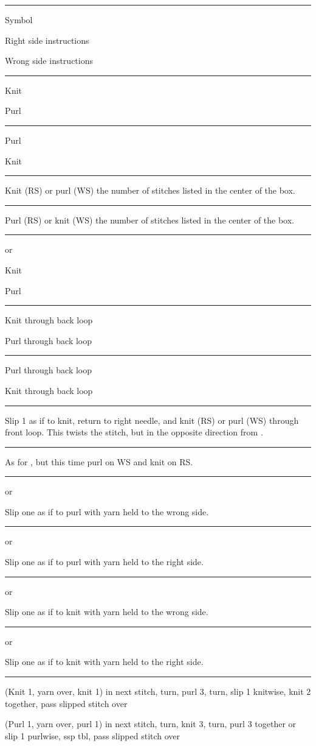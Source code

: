 \documentclass{amsart}
\newif \ifdesigner
\newlength{\symbolcolwidth}
\newlength{\singlecolwidth}
\newlength{\doublecolwidth}
\newcommand\keyrow[3]{\par\allowbreak\hrule\par\nopagebreak\noindent
	\vrule\hfill 
	\begin{minipage}{\symbolcolwidth}\centering#1\end{minipage}%
	\hfill\vrule\hfill
	\begin{minipage}{\singlecolwidth}
		\raisebox{1pt}{\strut}#2\raisebox{-1pt}{\strut}\end{minipage}%
	\hfill\vrule\hfill
	\begin{minipage}{\singlecolwidth}
		\raisebox{1pt}{\strut}#3\raisebox{-1pt}{\strut}\end{minipage}%
	\hfill\vrule
	\par\nointerlineskip}
\newcommand\dblkeyrow[2]{\par\allowbreak\hrule\par\nopagebreak\noindent
	\vrule\hfill
	\begin{minipage}{\symbolcolwidth}\centering#1\end{minipage}%
	\hfill\vrule\hfill
	\begin{minipage}{\doublecolwidth}
		\raisebox{1pt}{\strut}#2\raisebox{-1pt}{\strut}\end{minipage}%
	\hfill\vrule
	\par\nointerlineskip}
\begin{document}
\begin{fullpages}
\keyrow{Symbol}{Right side instructions}{Wrong side instructions}
\keyrow{\textknit{-}}{Knit}{Purl}
\keyrow{\textknit{=}}{Purl}{Knit}
\dblkeyrow{}{Knit (RS) or purl (WS) the number of stitches listed in the center of the box.}
\dblkeyrow{}{Purl (RS) or knit (WS) the number of stitches listed in the center of the box.}
\keyrow{\textknit{)} or \textknit{(}}{Knit}{Purl}
\keyrow{}{Knit through back loop}{Purl through back loop}
\keyrow{}{Purl through back loop}{Knit through back loop}
\dblkeyrow{}{Slip 1 as if to knit, return to right needle, and knit (RS) or purl (WS) through front loop. This twists the stitch, but in the opposite direction from \textknit{b}.}
\dblkeyrow{}{As for , but this time purl on WS and knit on RS.}
\dblkeyrow{ or }{Slip one as if to purl with yarn held to the wrong side.}
\dblkeyrow{ or \textknit{\purlbackground{S}}}
{Slip one as if to purl with yarn held to the right side.}
\dblkeyrow{\textknit{[} or \textknit{]}}{Slip one as if to knit with yarn held to the wrong side.}
\dblkeyrow{\textknit{\purlbackground{[}} or \textknit{\purlbackground{]}}}{Slip one as if to knit with yarn held to the right side.}
\keyrow{}
{(Knit 1, yarn over, knit 1) in next stitch, turn, purl 3, turn, slip 1 knitwise, knit 2 together, pass slipped stitch over}
{(Purl 1, yarn over, purl 1) in next stitch, turn, knit 3, turn, purl 3 together or slip 1 purlwise, ssp tbl, pass slipped stitch over}

\ifdesigner\hrule\medskip
If you use bobbles, be sure to define ssp tbl somewhere.
\clearpage\fi


\end{fullpages}
\end{document}
